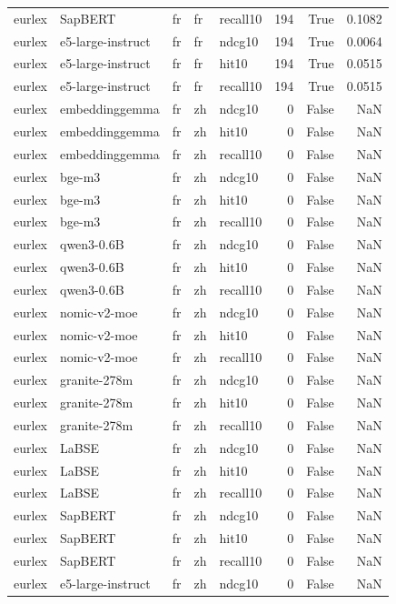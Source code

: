 \begin{tabular}{lllllrrr}
eurlex & SapBERT & fr & fr & recall10 & 194 & True & 0.1082 \\
eurlex & e5-large-instruct & fr & fr & ndcg10 & 194 & True & 0.0064 \\
eurlex & e5-large-instruct & fr & fr & hit10 & 194 & True & 0.0515 \\
eurlex & e5-large-instruct & fr & fr & recall10 & 194 & True & 0.0515 \\
eurlex & embeddinggemma & fr & zh & ndcg10 & 0 & False & NaN \\
eurlex & embeddinggemma & fr & zh & hit10 & 0 & False & NaN \\
eurlex & embeddinggemma & fr & zh & recall10 & 0 & False & NaN \\
eurlex & bge-m3 & fr & zh & ndcg10 & 0 & False & NaN \\
eurlex & bge-m3 & fr & zh & hit10 & 0 & False & NaN \\
eurlex & bge-m3 & fr & zh & recall10 & 0 & False & NaN \\
eurlex & qwen3-0.6B & fr & zh & ndcg10 & 0 & False & NaN \\
eurlex & qwen3-0.6B & fr & zh & hit10 & 0 & False & NaN \\
eurlex & qwen3-0.6B & fr & zh & recall10 & 0 & False & NaN \\
eurlex & nomic-v2-moe & fr & zh & ndcg10 & 0 & False & NaN \\
eurlex & nomic-v2-moe & fr & zh & hit10 & 0 & False & NaN \\
eurlex & nomic-v2-moe & fr & zh & recall10 & 0 & False & NaN \\
eurlex & granite-278m & fr & zh & ndcg10 & 0 & False & NaN \\
eurlex & granite-278m & fr & zh & hit10 & 0 & False & NaN \\
eurlex & granite-278m & fr & zh & recall10 & 0 & False & NaN \\
eurlex & LaBSE & fr & zh & ndcg10 & 0 & False & NaN \\
eurlex & LaBSE & fr & zh & hit10 & 0 & False & NaN \\
eurlex & LaBSE & fr & zh & recall10 & 0 & False & NaN \\
eurlex & SapBERT & fr & zh & ndcg10 & 0 & False & NaN \\
eurlex & SapBERT & fr & zh & hit10 & 0 & False & NaN \\
eurlex & SapBERT & fr & zh & recall10 & 0 & False & NaN \\
eurlex & e5-large-instruct & fr & zh & ndcg10 & 0 & False & NaN \\

\end{tabular}
